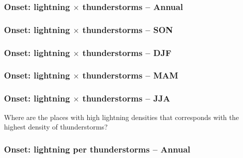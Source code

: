 \documentclass[smaller]{beamer}
\begin{document}
\begin{frame}

\end{frame}

\begin{frame}
\frametitle{Onset: lightning $\times$ thunderstorms -- Annual}

\end{frame}


\begin{frame}
\frametitle{Onset: lightning $\times$ thunderstorms -- SON}

\end{frame}


\begin{frame}
\frametitle{Onset: lightning $\times$ thunderstorms -- DJF}

\end{frame}

\begin{frame}
\frametitle{Onset: lightning $\times$ thunderstorms -- MAM}

\end{frame}

\begin{frame}
\frametitle{Onset: lightning $\times$ thunderstorms -- JJA}

\end{frame}




\begin{frame}
\Large
Where are the places with high lightning densities that corresponds with the highest density of thunderstorms?
\end{frame}

\begin{frame}
\frametitle{Onset: lightning per thunderstorms -- Annual}

\end{frame}



\begin{frame}

\end{frame}
\end{document}
